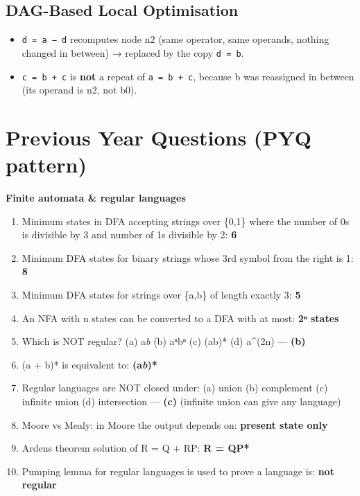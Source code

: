\hypertarget{p2-08--157-dag-based-local-optimisation}{%
\subsection{DAG-Based Local Optimisation}\label{p2-08--157-dag-based-local-optimisation}}



\begin{itemize}
\tightlist
\item
  \texttt{d\ =\ a\ −\ d} recomputes node n2 (same operator, same operands, nothing changed in between) → replaced by the copy \texttt{d\ =\ b}.
\item
  \texttt{c\ =\ b\ +\ c} is \textbf{not} a repeat of \texttt{a\ =\ b\ +\ c}, because b was reassigned in between (its operand is n2, not b0).
\end{itemize}

\needspace{125pt}

\hypertarget{p2-08--previous-year-questions-pyq-pattern}{%
\section{Previous Year Questions (PYQ pattern)}\label{p2-08--previous-year-questions-pyq-pattern}}

\textbf{Finite automata \& regular languages}

\begin{enumerate}
\def\labelenumi{\arabic{enumi}.}
\tightlist
\item
  Minimum states in DFA accepting strings over \{0,1\} where the number of 0s is divisible by 3 and number of 1s divisible by 2: \textbf{6}
\item
  Minimum DFA states for binary strings whose 3rd symbol from the right is 1: \textbf{8}
\item
  Minimum DFA states for strings over \{a,b\} of length exactly 3: \textbf{5}
\item
  An NFA with n states can be converted to a DFA with at most: \textbf{2ⁿ states}
\item
  Which is NOT regular? (a) a\emph{b} (b) aⁿbⁿ (c) (ab)* (d) a\^{}(2n) --- \textbf{(b)}
\item
  (a + b)* is equivalent to: \textbf{(a\emph{b})*}
\item
  Regular languages are NOT closed under: (a) union (b) complement (c) infinite union (d) intersection --- \textbf{(c)} (infinite union can give any language)
\item
  Moore vs Mealy: in Moore the output depends on: \textbf{present state only}
\item
  Arden\textquotesingle s theorem solution of R = Q + RP: \textbf{R = QP*}
\item
  Pumping lemma for regular languages is used to prove a language is: \textbf{not regular}
\end{enumerate}

